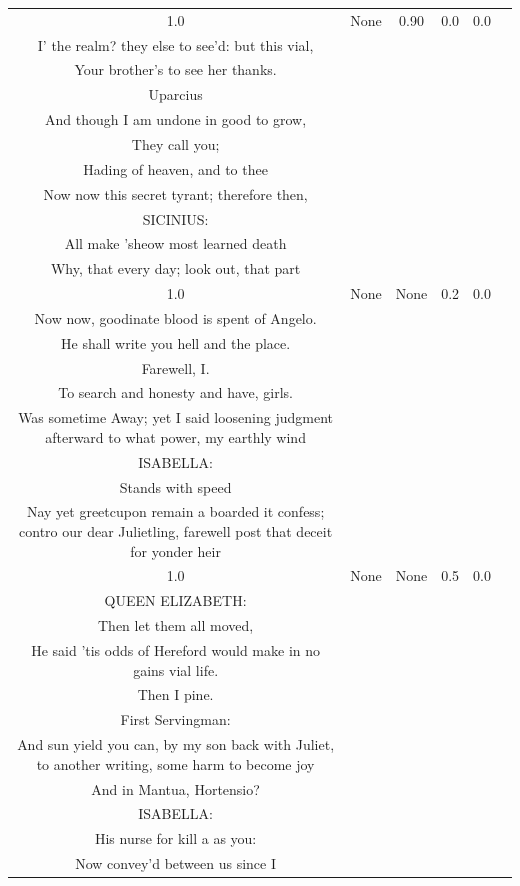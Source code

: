 \documentclass[11pt]{book}
\begin{document}
\begin{longtable}{ccccc >{\raggedright\arraybackslash}p{8cm}}
    1.0 & None & 0.90 & 0.0 & 0.0 &
    \begin{tcolorbox}[breakable, enhanced jigsaw, frame hidden, colback=white, boxrule=0pt]
    KING RICHARD:\\
    I' the realm? they else to see'd: but this vial,\\
    Your brother's to see her thanks.\\
    Uparcius\\
    And though I am undone in good to grow,\\
    They call you;\\
    Hading of heaven, and to thee\\
    Now now this secret tyrant; therefore then,\\
    SICINIUS:\\
    All make 'sheow most learned death\\
    Why, that every day; look out, that part
    \end{tcolorbox} \\
    
    1.0 & None & None & 0.2 & 0.0 &
    \begin{tcolorbox}[breakable, enhanced jigsaw, frame hidden, colback=white, boxrule=0pt]
    KING RICHARD:\\
    Now now, goodinate blood is spent of Angelo.\\
    He shall write you hell and the place.\\
    Farewell, I.\\
    To search and honesty and have, girls.\\
    Was sometime Away; yet I said loosening judgment afterward to what power, my earthly wind\\
    ISABELLA:\\
    Stands with speed\\
    Nay yet greetcupon remain a boarded it confess; contro our dear Julietling, farewell post that deceit for yonder heir
    \end{tcolorbox} \\
    
    1.0 & None & None & 0.5 & 0.0 &
    \begin{tcolorbox}[breakable, enhanced jigsaw, frame hidden, colback=white, boxrule=0pt]
    KING RICHARD:\\
    QUEEN ELIZABETH:\\
    Then let them all moved,\\
    He said 'tis odds of Hereford would make in no gains vial life.\\
    Then I pine.\\
    First Servingman:\\
    And sun yield you can, by my son back with Juliet, to another writing, some harm to become joy\\
    And in Mantua, Hortensio?\\
    ISABELLA:\\
    His nurse for kill a as you:\\
    Now convey'd between us since I
    \end{tcolorbox} \\
    

\end{longtable}
\end{document}
